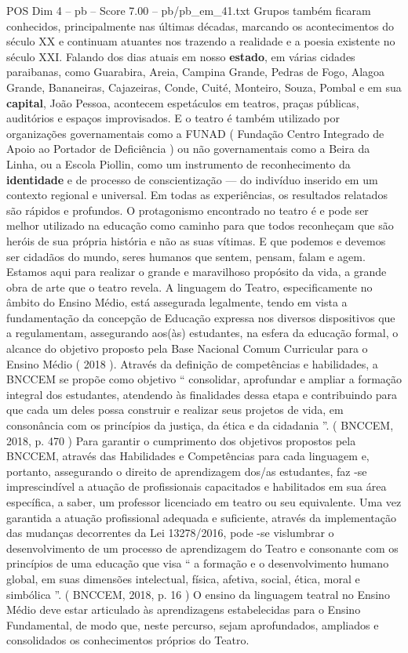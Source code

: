 \begin{textsample}{POS Dim 4 – pb – Score 7.00 – pb/pb\_em\_41.txt}
Grupos também ficaram conhecidos, principalmente nas últimas décadas, marcando os acontecimentos do século XX e continuam atuantes nos trazendo a realidade e a poesia existente no século XXI.
Falando dos dias atuais em nosso \textbf{estado}, em várias cidades paraibanas, como Guarabira, Areia, Campina Grande, Pedras de Fogo, Alagoa Grande, Bananeiras, Cajazeiras, Conde, Cuité, Monteiro, Souza, Pombal e em sua \textbf{capital}, João Pessoa, acontecem espetáculos em teatros, praças públicas, auditórios e espaços improvisados.
E o teatro é também utilizado por organizações governamentais como a FUNAD ( Fundação Centro Integrado de Apoio ao Portador de Deficiência ) ou não governamentais como a Beira da Linha, ou a Escola Piollin, como um instrumento de reconhecimento da \textbf{identidade} e de processo de conscientização — do indivíduo inserido em um contexto regional e universal.
Em todas as experiências, os resultados relatados são rápidos e profundos.
O protagonismo encontrado no teatro é e pode ser melhor utilizado na educação como caminho para que todos reconheçam que são heróis de sua própria história e não as suas vítimas.
E que podemos e devemos ser cidadãos do mundo, seres humanos que sentem, pensam, falam e agem.
Estamos aqui para realizar o grande e maravilhoso propósito da vida, a grande obra de arte que o teatro revela.
A linguagem do Teatro, especificamente no âmbito do Ensino Médio, está assegurada legalmente, tendo em vista a fundamentação da concepção de Educação expressa nos diversos dispositivos que a regulamentam, assegurando aos(às) estudantes, na esfera da educação formal, o alcance do objetivo proposto pela Base Nacional Comum Curricular para o Ensino Médio ( 2018 ).
Através da definição de competências e habilidades, a BNCCEM se propõe como objetivo “ consolidar, aprofundar e ampliar a formação integral dos estudantes, atendendo às finalidades dessa etapa e contribuindo para que cada um deles possa construir e realizar seus projetos de vida, em consonância com os princípios da justiça, da ética e da cidadania ”. ( BNCCEM, 2018, p. 470 ) Para garantir o cumprimento dos objetivos propostos pela BNCCEM, através das Habilidades e Competências para cada linguagem e, portanto, assegurando o direito de aprendizagem dos/as estudantes, faz -se imprescindível a atuação de profissionais capacitados e habilitados em sua área específica, a saber, um professor licenciado em teatro ou seu equivalente.
Uma vez garantida a atuação profissional adequada e suficiente, através da implementação das mudanças decorrentes da Lei 13278/2016, pode -se vislumbrar o desenvolvimento de um processo de aprendizagem do Teatro e consonante com os princípios de uma educação que visa “ a formação e o desenvolvimento humano global, em suas dimensões intelectual, física, afetiva, social, ética, moral e simbólica ”. ( BNCCEM, 2018, p. 16 ) O ensino da linguagem teatral no Ensino Médio deve estar articulado às aprendizagens estabelecidas para o Ensino Fundamental, de modo que, neste percurso, sejam aprofundados, ampliados e consolidados os conhecimentos próprios do Teatro.

\end{textsample}
